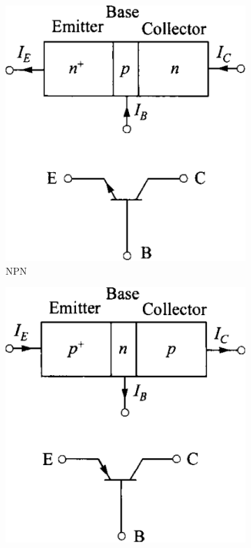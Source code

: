 \documentclass[conference]{IEEEtran}
\begin{document}
\begin{figure}[htbp]
    \centering
    \hspace*{\fill}
    \begin{subfigure}[b]{0.2\textwidth}
        \centerline{\includegraphics[width=\textwidth]{figures/NPN.png}}
        \caption{NPN}
    \end{subfigure}
    \hspace*{\fill}
    \begin{subfigure}[b]{0.2\textwidth}
        \centerline{\includegraphics[width=\textwidth]{figures/PNP.png}}

\end{subfigure}
\end{figure}
\end{document}

